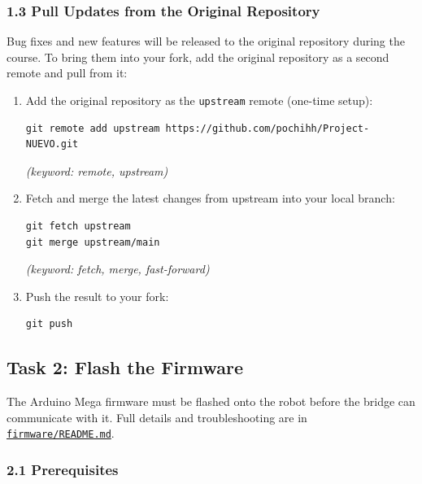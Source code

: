 \documentclass{ol-softwaremanual}
\newcommand{\doclink}[2]{\href{#1}{#2}}
\begin{document}
\subsubsection*{1.3 Pull Updates from the Original Repository}

Bug fixes and new features will be released to the original repository during the
course.
To bring them into your fork, add the original repository as a second remote and
pull from it:

\begin{enumerate}
  \item Add the original repository as the \texttt{upstream} remote (one-time setup):
\begin{verbatim}
git remote add upstream https://github.com/pochihh/Project-NUEVO.git
\end{verbatim}
        \hfill\textit{(keyword: remote, upstream)}

  \item Fetch and merge the latest changes from upstream into your local branch:
\begin{verbatim}
git fetch upstream
git merge upstream/main
\end{verbatim}
        \hfill\textit{(keyword: fetch, merge, fast-forward)}

  \item Push the result to your fork:
\begin{verbatim}
git push
\end{verbatim}
\end{enumerate}


\subsection{Task 2: Flash the Firmware}

The Arduino Mega firmware must be flashed onto the robot before the bridge can
communicate with it.
Full details and troubleshooting are in
\doclink{https://github.com/pochihh/Project-NUEVO/blob/main/firmware/README.md}{\texttt{firmware/\allowbreak README.md}}.

\subsubsection*{2.1 Prerequisites}
\end{document}
